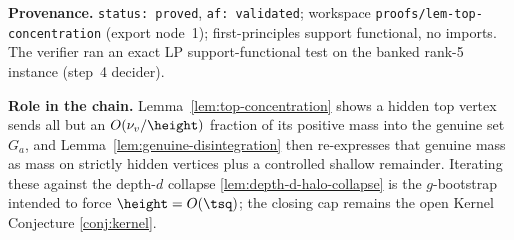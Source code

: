\noindent\textbf{Provenance.} \texttt{status: proved}, \texttt{af: validated}; workspace
\texttt{proofs/lem-top-concentration} (export node~1); first-principles support functional, no imports.
The verifier ran an exact LP support-functional test on the banked rank-5 instance (step~4 decider).

\noindent\textbf{Role in the chain.} Lemma~\ref{lem:top-concentration} shows a hidden top vertex sends
all but an $O(\nu_v/\height)$ fraction of its positive mass into the genuine set $G_a$, and
Lemma~\ref{lem:genuine-disintegration} then re-expresses that genuine mass as mass on strictly hidden
vertices plus a controlled shallow remainder. Iterating these against the depth-$d$ collapse
\ref{lem:depth-d-halo-collapse} is the $g$-bootstrap intended to force $\height=O(\tsq)$; the closing
cap remains the open Kernel Conjecture \ref{conj:kernel}.
